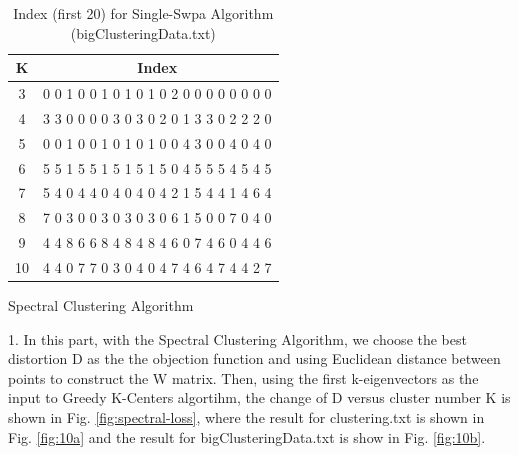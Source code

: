 \begin{description}
\begin{description}
\begin{table}[H]
	\centering
	\caption{Index (first 20) for Single-Swpa Algorithm (bigClusteringData.txt)}
	\label{table:index_single_bigClustering}	
	\begin{tabular}{ c | c }
		\hline \hline
		K    & Index \\[0.1cm]
		\hline
		3     &  0 0 1 0 0 1 0 1 0 1 0 2 0 0 0 0 0 0 0 0 \\[0.1cm]
		4     &  3 3 0 0 0 0 3 0 3 0 2 0 1 3 3 0 2 2 2 0 \\[0.1cm]
		5     &  0 0 1 0 0 1 0 1 0 1 0 0 4 3 0 0 4 0 4 0 \\[0.1cm]
		6     &  5 5 1 5 5 1 5 1 5 1 5 0 4 5 5 5 4 5 4 5 \\[0.1cm]
		7     &  5 4 0 4 4 0 4 0 4 0 4 2 1 5 4 4 1 4 6 4 \\[0.1cm]
		8     &  7 0 3 0 0 3 0 3 0 3 0 6 1 5 0 0 7 0 4 0 \\[0.1cm]
		9     &  4 4 8 6 6 8 4 8 4 8 4 6 0 7 4 6 0 4 4 6 \\[0.1cm]
		10   &  4 4 0 7 7 0 3 0 4 0 4 7 4 6 4 7 4 4 2 7 \\[0.1cm]
		\hline	
	\end{tabular}
\end{table}

\end{description}


\item[(\Romannum{4}).] Spectral Clustering Algorithm

\begin{description}
\item{1.} In this part, with the Spectral Clustering Algorithm, we choose the best distortion D as the the objection function and using Euclidean distance between points to construct the W matrix. Then, using the first k-eigenvectors as the input to Greedy K-Centers algortihm, the change of D versus cluster number K is shown in Fig. \ref{fig:spectral-loss}, where the result for clustering.txt is shown in Fig. \ref{fig:10a} and the result for bigClusteringData.txt is show in Fig. \ref{fig:10b}.


\end{description}
\end{description}
